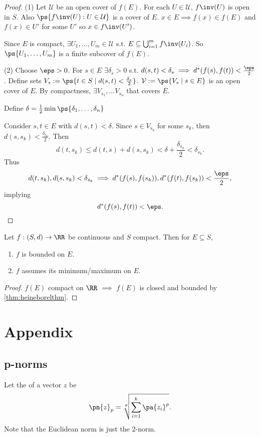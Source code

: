 \documentclass[11pt]{scrartcl}
\numberwithin{equation}{section}
\begin{document}
\begin{proof}
    (1) Let $\mathcal U$ be an open cover of $f(E)$. For each 
    $U\in \mathcal{U}$, $f\inv(U)$ is open in $S$. Also 
    $\ps{f\inv(U):U\in \mathcal{U}}$ is a cover of $E$. $x\in E \implies f(x)\in f(E)$ and $f(x)\in U'$ for some $U'$ so $x\in f\inv(U')$.

    Since $E$ is compact, $\exists U_1,\dots, U_m \in \mathcal{U}$ s.t. 
    $E \subseteq \bigcup_{i=1}^{m}f\inv(U_i)$. So $\ps{U_1,\dots,U_m}$ is a 
    finite subcover of $f(E)$.

    (2) Choose $\eps>0$. For $s\in E$ $\exists \delta_s>0$ s.t. 
    $d(s,t)< \delta_s \implies d^*(f(s),f(t)) < \frac{\eps}{2}$.
    Define sets $V_s := \ps{t\in S \mid d(s,t)<\frac{\delta_s}{2}}$.
    $\mathcal{V}:=\ps{V_s\mid s\in E}$ is an open cover of $E$. 
    By compactness, $\exists V_{s_1},\dots V_{s_n}$ that covers $E$.

    Define $\delta = \frac{1}{2}\min\ps{\delta_1,\dots,\delta_n}$

    Consider $s,t\in E$ with $d(s,t)<\delta$. Since $s\in V_{s_k}$ for 
    some $s_k$, then $d(s,s_k)<\frac{\delta_{s_k}}{2}$. Then 
    \[
        d(t, s_k) \leq d(t,s) + d(s,s_k) < \delta+\frac{\delta_{s_k}}{2} < \delta_{s_k}.
    \]
    Thus 
    \[
        d(t, s_k), d(s,s_k) < \delta_{s_k} \implies 
        d^*(f(s),f(s_k)), d^*(f(t),f(s_k)) < \frac{\eps}{2},
    \]
    implying 
    \[
        d^*(f(s),f(t)) < \eps.
    \]
\end{proof}

\begin{corollary}
    Let $f : (S,d) \rightarrow \RR$ be continuous and $S$ compact. 
    Then for $E \subseteq S$, 
    \begin{enumerate}
        \item $f$ is bounded on $E$.
        \item $f$ assumes its minimum/maximum on $E$.
    \end{enumerate}
\end{corollary}

\begin{proof}
    $f(E)$ compact on $\RR$ $\implies$ $f(E)$ is closed and bounded 
    by \cref{thm:heineborelthm}.
\end{proof}

\clearpage
\appendix
\section{Appendix}
\subsection{p-norms}
Let the  of a vector $z$ be 
\[\pn{z}_p = \sqrt[p]{\sum_{i=1}^{k}\pa{z_i}^p}. \]
Note that the Euclidean norm is just the $2$-norm.
\end{document}
